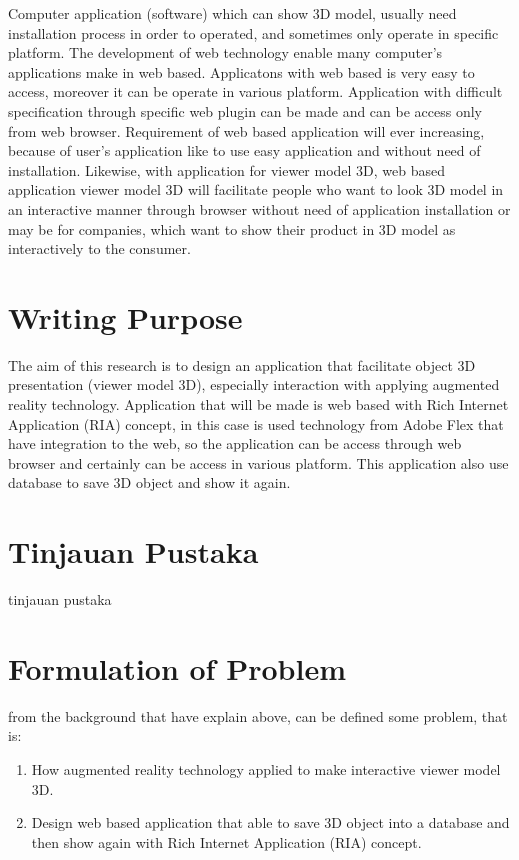 \documentclass[12pt,a4paper,pdftex,final,oneside,titlepage]{book}
\begin{document}
Computer application (software) which can show 3D model, usually need installation process in order to operated, and sometimes only operate in specific platform. The development of web technology enable many computer's applications make in web based. Applicatons with web based is very easy to access, moreover it can be operate in various platform. Application with difficult specification through specific web plugin can be made and can be access only from web browser. Requirement of web based application will ever increasing, because of user's application like to use easy application and without need of installation.  Likewise, with application for viewer model 3D, web based application viewer model 3D will facilitate people who want to look 3D model in an interactive manner through browser without need of application installation or may be for companies, which want to show their product in 3D model as interactively to the consumer.

\section{Writing Purpose}
\label{sec:tujuan_penulisan}
The aim of this research is to design an application that facilitate object 3D presentation (viewer model 3D), especially interaction with applying augmented reality technology. Application that will be made is web based with Rich Internet Application (RIA) concept, in this case is used technology from Adobe Flex that have integration to the web, so the application can be access through web browser and certainly can be access in various platform. This application also use database to save 3D object and show it again.

\section{Tinjauan Pustaka}
\label{sec:tinjauan_pustaka}
tinjauan pustaka
\section{Formulation of Problem} %
\label{rumusan}
from the background that have explain above, can be defined some problem, that is:\\
\begin{enumerate}
\item How augmented reality technology applied to make interactive viewer model 3D.
\item Design web based application that able to save 3D object into a database and then show again with Rich Internet Application (RIA) concept.
\end{enumerate}
\end{document}
